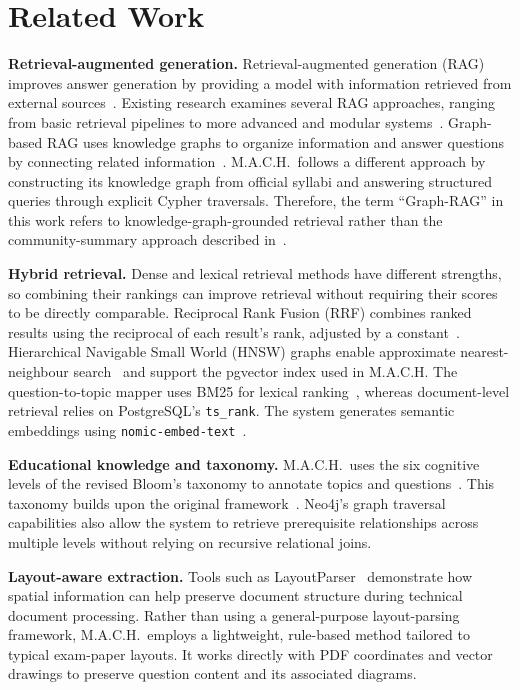 \documentclass[conference]{IEEEtran}
\newcommand{\code}[1]{\texttt{\small #1}}
\begin{document}
\section{Related Work}

\textbf{Retrieval-augmented generation.}
Retrieval-augmented generation (RAG) improves answer generation by providing a model with information retrieved from external sources~\cite{lewis2020}. Existing research examines several RAG approaches, ranging from basic retrieval pipelines to more advanced and modular systems~\cite{gao2023}. Graph-based RAG uses knowledge graphs to organize information and answer questions by connecting related information~\cite{edge2024}. M.A.C.H.\ follows a different approach by constructing its knowledge graph from official syllabi and answering structured queries through explicit Cypher traversals. Therefore, the term ``Graph-RAG'' in this work refers to knowledge-graph-grounded retrieval rather than the community-summary approach described in~\cite{edge2024}.

\textbf{Hybrid retrieval.}
Dense and lexical retrieval methods have different strengths, so combining their rankings can improve retrieval without requiring their scores to be directly comparable. Reciprocal Rank Fusion (RRF) combines ranked results using the reciprocal of each result's rank, adjusted by a constant~\cite{cormack2009}. Hierarchical Navigable Small World (HNSW) graphs enable approximate nearest-neighbour search~\cite{malkov2020} and support the pgvector index used in M.A.C.H. The question-to-topic mapper uses BM25 for lexical ranking~\cite{robertson2009}, whereas document-level retrieval relies on PostgreSQL's \code{ts\_rank}. The system generates semantic embeddings using \code{nomic-embed-text}~\cite{nussbaum2024}.

\textbf{Educational knowledge and taxonomy.}
M.A.C.H.\ uses the six cognitive levels of the revised Bloom's taxonomy to annotate topics and questions~\cite{anderson2001}. This taxonomy builds upon the original framework~\cite{bloom1956}. Neo4j's graph traversal capabilities also allow the system to retrieve prerequisite relationships across multiple levels without relying on recursive relational joins.

\textbf{Layout-aware extraction.}
Tools such as LayoutParser~\cite{shen2021} demonstrate how spatial information can help preserve document structure during technical document processing. Rather than using a general-purpose layout-parsing framework, M.A.C.H.\ employs a lightweight, rule-based method tailored to typical exam-paper layouts. It works directly with PDF coordinates and vector drawings to preserve question content and its associated diagrams.
\end{document}
